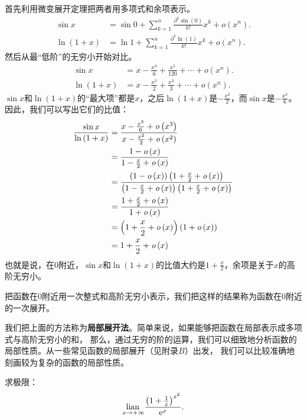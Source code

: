 \documentclass[12pt,UTF8]{ctexbook}
\begin{document}
首先利用微变展开定理把两者用多项式和余项表示。
\begin{align*}
    \sin{x} &= \sin{0} + \sum_{k=1}^n \frac{\partial^k \sin (0)}{k!}x^k + \mathit{o}(x^n).  \\
    \ln{(1 + x)} &= \ln{1} + \sum_{k=1}^n \frac{\partial^k \ln (1)}{k!}x^k + \mathit{o}(x^n).  
\end{align*}
然后从最“低阶”的无穷小开始对比。
\begin{align*}
    \sin{x} &= x - \frac{x^3}{6} + \frac{x^5}{120} + \cdots + \mathit{o}(x^n).  \\
    \ln{(1 + x)} &= x - \frac{x^2}{2} + \frac{x^3}{3} + \cdots + \mathit{o}(x^n). 
\end{align*}
$\sin{x}$和$\ln{(1+x)}$的“最大项”都是$x$，之后$\ln{(1+x)}$是$- \frac{x^2}{2}$，而$\sin{x}$是$- \frac{x^3}{6}$。
因此，我们可以写出它们的比值：
\begin{align*}
    \frac{\sin{x}}{\ln{(1 + x)}} &= \frac{x - \frac{x^3}{6} + \mathit{o}\left(x^3\right)}{x - \frac{x^2}{2} + \mathit{o}\left(x^2\right)}  \\
    &= \frac{1 - \mathit{o}\left(x\right)}{1 - \frac{x}{2} + \mathit{o}\left(x\right)}  \\
    &= \frac{(1 - \mathit{o}\left(x\right))\left(1 + \frac{x}{2} + \mathit{o}\left(x\right)\right)}{\left(1 - \frac{x}{2} + \mathit{o}\left(x\right)\right)\left(1 + \frac{x}{2} + \mathit{o}\left(x\right)\right)}  \\
    &= \frac{1 + \frac{x}{2} + \mathit{o}\left(x\right)}{1 + \mathit{o}\left(x\right)}  \\
    &= \left(1 + \frac{x}{2} + \mathit{o}\left(x\right)\right)(1 + \mathit{o}\left(x\right))  \\
    &= 1 + \frac{x}{2} + \mathit{o}\left(x\right) 
\end{align*}
也就是说，在$0$附近，$\sin{x}$和$\ln{(1+x)}$的比值大约是$1 + \frac{x}{2}$，余项是关于$x$的高阶无穷小。

把函数在$0$附近用一次整式和高阶无穷小表示，我们把这样的结果称为函数在$0$附近的一次展开。

我们把上面的方法称为\textbf{局部展开法}。简单来说，如果能够把函数在局部表示成多项式与高阶无穷小的和，
那么，通过无穷的阶的运算，我们可以细致地分析函数的局部性质。从一些常见函数的局部展开（见附录$B$）出发，
我们可以比较准确地刻画较为复杂的函数的局部性质。

\begin{et}
    求极限：
    $$ \underset{x\to +\infty}{\operatorname{lian}\,} \frac{\left(1 + \frac{1}{x}\right)^{x^2}}{\mathrm{e}^x}.$$
\end{et}
\end{document}
